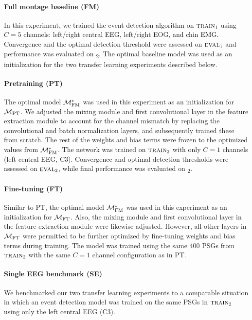 \paragraph{Full montage baseline (FM)}
In this experiment, we trained the event detection algorithm on $\textsc{train}_1$ using \(C=5\) channels: left/right central \ac{EEG}, left/right \ac{EOG}, and chin \ac{EMG}.
Convergence and the optimal detection threshold were assessed on $\textsc{eval}_1$ and performance was evaluated on \test{}\textsubscript{2}.
The optimal baseline model was used as an initialization for the two transfer learning experiments described below.
\paragraph{Pretraining (PT)}
The optimal model $\mathcal{M}_{\mathrm{FM}}^{*}$ was used in this experiment as an initialization for $\mathcal{M}_{\mathrm{PT}}$.
We adjusted the mixing module and first convolutional layer in the feature extraction module to account for the channel mismatch by replacing the convolutional and batch normalization layers, and subsequently trained these from scratch.
The rest of the weights and bias terms were frozen to the optimized values from $\mathcal{M}_{\mathrm{FM}}^{*}$.
The network was trained on $\textsc{train}_2$ with only $C=1$ channels (left central \ac{EEG}, C3).
Convergence and optimal detection thresholds were assessed on $\textsc{eval}_2$, while final performance was evaluated on \test{}\textsubscript{2}.
\paragraph{Fine-tuning (FT)}
Similar to PT, the optimal model $\mathcal{M}_{\mathrm{FM}}^{*}$ was used in this experiment as an initialization for $\mathcal{M}_{\mathrm{FT}}$.
Also, the mixing module and first convolutional layer in the feature extraction module were likewise adjusted.
However, all other layers in $\mathcal{M}_{\mathrm{FT}}$ were permitted to be further optimized by fine-tuning weights and bias terms during training.
The model was trained using the same 400 \acp{PSG} from $\textsc{train}_2$ with the same $C=1$ channel configuration as in PT.
\paragraph{Single EEG benchmark (SE)}
We benchmarked our two transfer learning experiments to a comparable situation in which an event detection model was trained on the same \acp{PSG} in $\textsc{train}_2$ using only the left central \ac{EEG} (C3).

